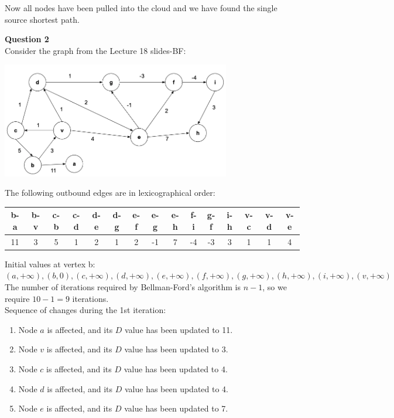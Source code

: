 \documentclass{article}
\begin{document}
Now all nodes have been pulled into the cloud and we have found the single source shortest path.

\bigskip
{\bf Question 2}\\
Consider the graph from the Lecture 18 slides-BF:
\begin{center}
    \includegraphics[width=0.75\textwidth]{2.png}
\end{center}

The following outbound edges are in lexicographical order:
\begin{center}
\begin{tabular}{||c c c c c c c c c c c c c c c||} 
 \hline
 b-a & b-v & c-b & c-d & d-e & d-g & e-f & e-g & e-h & f-i & g-f & i-h & v-c & v-d & v-e\\ [0.5ex] 
 \hline\hline
 11 & 3 & 5 & 1 & 2 & 1 & 2 & -1 & 7 & -4 & -3 & 3 & 1 & 1 & 4\\ 
 \hline
\end{tabular}
\end{center}

Initial values at vertex b:\\
$(a, + \infty), (b, 0), (c, + \infty), (d, + \infty), (e, + \infty), (f, + \infty), (g, + \infty), (h, + \infty), (i, + \infty), (v, + \infty)$\\

The number of iterations required by Bellman-Ford's algorithm is $n-1$, so we require $10-1=9$ iterations.\\

Sequence of changes during the 1st iteration:
\begin{enumerate}
    \item Node $a$ is affected, and its $D$ value has been updated to 11. 
    \item Node $v$ is affected, and its $D$ value has been updated to 3. 
    \item Node $c$ is affected, and its $D$ value has been updated to 4.   
    \item Node $d$ is affected, and its $D$ value has been updated to 4.
    \item Node $e$ is affected, and its $D$ value has been updated to 7.
\end{enumerate}
\end{document}
